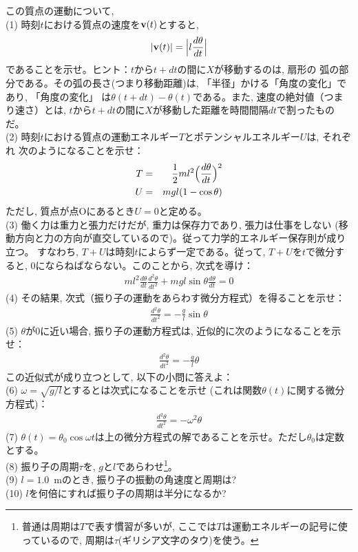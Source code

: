 \begin{q}\label{q:furiko_energy} この質点の運動について, \\
(1) 時刻$t$における質点の速度を${\bf v}(t)$とすると, 
\begin{eqnarray} 
|{\bf v}(t)|=\Bigl|l\frac{d\theta}{dt}\Bigr|
\end{eqnarray} 
であることを示せ。{\small ヒント：$t$から$t+dt$の間に$X$が移動するのは, 扇形の
弧の部分である。その弧の長さ(つまり移動距離)は, 
「半径」かける「角度の変化」であり, 「角度の変化」
は$\theta(t+dt)-\theta(t)$である。また, 速度の絶対値（つまり速さ）とは, 
$t$から$t+dt$の間に$X$が移動した距離を時間間隔$dt$で割ったものだ。}\\
(2) 時刻$t$における質点の運動エネルギー$T$とポテンシャルエネルギー$U$は, それぞれ
次のようになることを示せ：
\begin{eqnarray} 
T&=&\frac{1}{2}m l^2\Bigl(\frac{d\theta}{dt}\Bigr)^2\\
U&=&mgl(1-\cos \theta)
\end{eqnarray} 
ただし, 質点が点Oにあるとき$U=0$と定める。\\
(3) 働く力は重力と張力だけだが, 重力は保存力であり, 張力は仕事をしない
(移動方向と力の方向が直交しているので)。従って力学的エネルギー保存則が成り立つ。
すなわち, $T+U$は時刻$t$によらず一定である。従って, 
$T+U$を$t$で微分すると, 0にならねばならない。このことから, 次式を導け：
\begin{eqnarray} 
ml^2\frac{d\theta}{dt}\frac{d^2\theta}{dt^2}+mgl\sin\theta\frac{d\theta}{dt}=0
\end{eqnarray} 
(4) その結果, 次式（振り子の運動をあらわす微分方程式）を得ることを示せ：
\begin{eqnarray} 
\frac{d^2\theta}{dt^2}=-\frac{g}{l}\sin\theta\label{eq:furiko_equation}
\end{eqnarray} 
(5) $\theta$が0に近い場合, 振り子の運動方程式は, 近似的に次のようになることを示せ：
\begin{eqnarray} 
\frac{d^2\theta}{dt^2}=-\frac{g}{l}\theta\label{eq:furiko_energy5}
\end{eqnarray} 
この近似式が成り立つとして, 以下の小問に答えよ：\\
(6) $\omega=\sqrt{g/l}$とするとは次式になることを示せ
(これは関数$\theta(t)$に関する微分方程式)：
\begin{eqnarray} 
\frac{d^2\theta}{dt^2}=-\omega^2\theta\label{eq:furiko_energy6}
\end{eqnarray} 
(7) $\theta(t)=\theta_0 \cos\omega t$は上の微分方程式の解であることを示せ。ただし$\theta_0$は定数とする。\\
(8) 振り子の周期$\tau$を, $g$と$l$であらわせ\footnote{普通は周期は$T$で表す慣習が多いが, ここでは$T$は運動エネルギーの記号に使っているので, 周期は$\tau$(ギリシア文字のタウ)を使う。}。\\
(9) $l=1.0$~mのとき, 振り子の振動の角速度と周期は?\\
(10) $l$を何倍にすれば振り子の周期は半分になるか?
\end{q}


